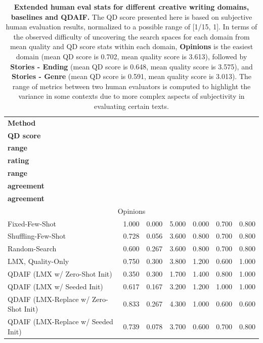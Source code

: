 \begin{table}[ht]
\caption{\textbf{Extended human eval stats for different creative writing domains, baselines and QDAIF.} The QD score presented here is based on subjective human evaluation results, normalized to a possible range of [1/15, 1]. In terms of the observed difficulty of uncovering the search spaces for each domain from mean quality and QD score stats within each domain, \textbf{Opinions} is the easiest domain (mean QD score is 0.702, mean quality score is 3.613), followed by \textbf{Stories - Ending} (mean QD score is 0.648, mean quality score is 3.575), and \textbf{Stories - Genre} (mean QD score is 0.591, mean quality score is 3.013). The range of metrics between two human evaluators is computed to highlight the variance in some contexts due to more complex aspects of subjectivity in evaluating certain texts.}
\label{app:table_human_eval_baselines_vs_aif}
\vspace{0.2cm}
\centering
\scriptsize
\begin{tabular}{@{}lcccccc@{}}
\toprule
\textbf{Method} &
\makecell[c]{\textbf{Human}\\\textbf{QD score}} & 
\makecell[c]{\textbf{QD score}\\\textbf{range}} &
\makecell[c]{\textbf{Quality}\\\textbf{rating}} &
\makecell[c]{\textbf{Quality}\\\textbf{range}}  & 
\makecell[c]{\textbf{Human-AI}\\\textbf{agreement}} & 
\makecell[c]{\textbf{Human}\\\textbf{agreement}}  \\
\midrule
\multicolumn{7}{c}{Opinions} \\
\midrule
Fixed-Few-Shot & 1.000 & 0.000 & 5.000 & 0.000 & 0.700 & 0.800  \\ 
Shuffling-Few-Shot & 0.728 & 0.056 & 3.600 & 0.800 & 0.700 & 0.800  \\ 
Random-Search & 0.600 & 0.267 & 3.600 & 0.800 & 0.700 & 0.800  \\ 
LMX, Quality-Only & 0.750 & 0.300 & 3.800 & 1.200 & 0.600 & 1.000  \\ 
QDAIF (LMX w/ Zero-Shot Init) & 0.350 & 0.300 & 1.700 & 1.400 & 0.800 & 1.000  \\ 
QDAIF (LMX w/ Seeded Init) & 0.617 & 0.167 & 3.200 & 1.200 & 1.000 & 1.000  \\ 
QDAIF (LMX-Replace w/ Zero-Shot Init) & 0.833 & 0.267 & 4.300 & 1.000 & 0.600 & 0.600  \\ 
QDAIF (LMX-Replace w/ Seeded Init) & 0.739 & 0.078 & 3.700 & 0.600 & 0.700 & 0.800 \\ 

\end{tabular}
\end{table}
